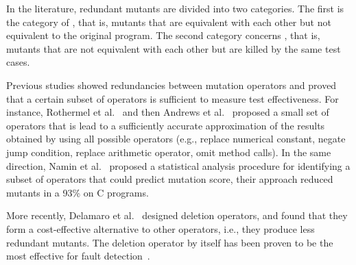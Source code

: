 
In the literature, redundant mutants are divided into two categories. The first is the category of , that is, mutants that are equivalent with each other but not equivalent to the original program. The second category concerns , that is, mutants that are not equivalent with each other but are killed by the same test cases. 

Previous studies showed redundancies between mutation operators and proved that a certain subset of operators is sufficient to measure test effectiveness. For instance, Rothermel et al.~\cite{rothermel1996experimental} and then Andrews et al.~\cite{andrews2005mutation} proposed a small set of operators that is lead to a sufficiently accurate approximation of the results obtained by using all possible operators (e.g., replace numerical constant, negate jump condition, replace arithmetic operator, omit method calls). In the same direction, Namin et al.~\cite{siami2008sufficient} proposed a statistical analysis procedure for identifying a subset of operators that could predict mutation score, their approach reduced mutants in a 93\% on C programs. 

More recently, Delamaro et al.~\cite{delamaro2014designing} designed deletion operators, and found that they form a cost-effective alternative to other operators, i.e., they produce less redundant mutants. The deletion operator by itself has been proven to be the most effective for fault detection~\cite{delamaro2014designing}.

